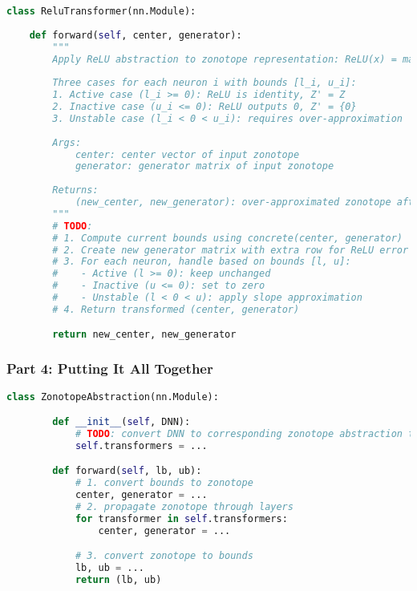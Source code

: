 \begin{lstlisting}[language=Python]
class ReluTransformer(nn.Module):
    
    def forward(self, center, generator):
        """
        Apply ReLU abstraction to zonotope representation: ReLU(x) = max(0, x)
        
        Three cases for each neuron i with bounds [l_i, u_i]:
        1. Active case (l_i >= 0): ReLU is identity, Z' = Z  
        2. Inactive case (u_i <= 0): ReLU outputs 0, Z' = {0}
        3. Unstable case (l_i < 0 < u_i): requires over-approximation
        
        Args:
            center: center vector of input zonotope
            generator: generator matrix of input zonotope  
            
        Returns:
            (new_center, new_generator): over-approximated zonotope after ReLU
        """
        # TODO:
        # 1. Compute current bounds using concrete(center, generator)
        # 2. Create new generator matrix with extra row for ReLU error
        # 3. For each neuron, handle based on bounds [l, u]:
        #    - Active (l >= 0): keep unchanged
        #    - Inactive (u <= 0): set to zero
        #    - Unstable (l < 0 < u): apply slope approximation
        # 4. Return transformed (center, generator)

        return new_center, new_generator

\end{lstlisting}

\subsubsection{Part 4: Putting It All Together}

\begin{lstlisting}[language=Python]
    class ZonotopeAbstraction(nn.Module):

        def __init__(self, DNN):
            # TODO: convert DNN to corresponding zonotope abstraction transformers
            self.transformers = ...

        def forward(self, lb, ub):
            # 1. convert bounds to zonotope
            center, generator = ...
            # 2. propagate zonotope through layers
            for transformer in self.transformers:
                center, generator = ...

            # 3. convert zonotope to bounds
            lb, ub = ...
            return (lb, ub)

\end{lstlisting}

